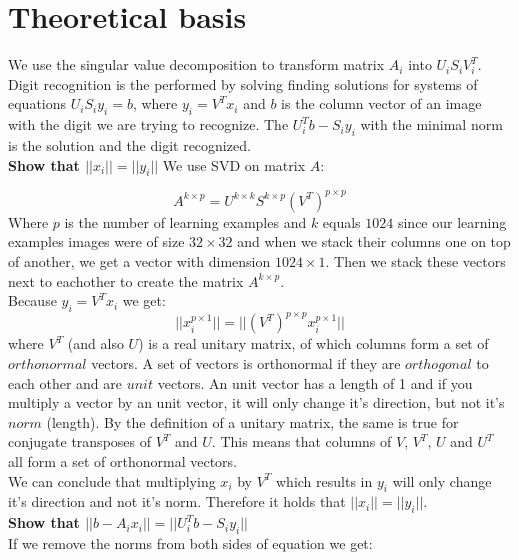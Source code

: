 \documentclass[12pt]{article}
\begin{document}
\newpage
\section{Theoretical basis}
We use the singular value decomposition to transform matrix $A_i$ into $U_iS_iV_i^{T}$. Digit recognition is the performed by solving finding solutions for systems of equations $U_iS_iy_i = b$, where $y_i = V^Tx_i$ and $b$ is the column vector of an image with the digit we are trying to recognize. The $U_i^{T}b - S_iy_i$ with the minimal norm is the solution and the digit recognized. \\
\newline
\textbf{Show that $||x_i|| = ||y_i||$} 
\newline
We use SVD on matrix $A$:

\[
A^{k \times p} = U^{k \times k}S^{k \times p}(V^T)^{p \times p}
\]
\newline
Where $p$ is the number of learning examples and $k$ equals $1024$ since our learning examples images were of size $32 \times 32$ and when we stack their columns one on top of another, we get a vector with dimension $1024 \times 1$. Then we stack these vectors next to eachother to create the matrix $A^{k \times p}$. \\
\newline
Because $y_i = V^Tx_i$ we get:
\newline
\[
 ||x_i^{p \times 1}|| = || (V^T)^{ p \times p} x_i^{p \times 1}||
\]
\newline
where $V^T$ (and also $U$) is a real unitary matrix, of which columns form a set of $orthonormal$ vectors. A set of vectors is orthonormal if they are $orthogonal$ to each other and are $unit$ vectors. An unit vector has a length of 1 and if you multiply a vector by an unit vector, it will only change it's direction, but not it's $norm$ (length). By the definition of a unitary matrix, the same is true for conjugate transposes of $V^T$ and $U$. This means that columns of $V$, $V^T$, $U$ and $U^T$ all form a set of orthonormal vectors. \\
\newline
We can conclude that multiplying $x_i$ by $V^T$ which results in $y_i$ will only change it's direction and not it's norm. Therefore it holds that $||x_i|| = ||y_i||$. \\
\newline
\textbf{Show that $||b - A_ix_i|| = ||U_i^{T}b - S_iy_i||$} \\
If we remove the norms from both sides of equation we get:\\
\end{document}
